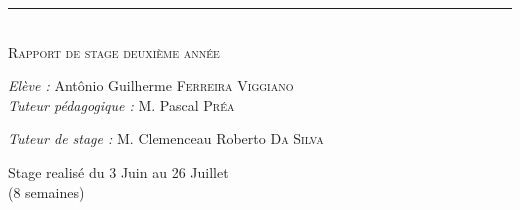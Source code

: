 \begin{titlepage}
\begin{center}
\hrule  ~\\[0.5cm]

\textsc{\LARGE Rapport de stage deuxième année}\\[1.5cm]


\end{center}


\vfill


\large\emph{Elève :} \hfill Antônio Guilherme \textsc{Ferreira Viggiano} ~\\

\large\emph{Tuteur pédagogique :} \hfill M. Pascal \textsc{Préa}

\large\emph{Tuteur de stage :} \hfill M. Clemenceau Roberto \textsc{Da Silva}

\vfill

\begin{center}
  \large Stage realisé du 3 Juin au 26 Juillet \\
  (8 semaines)
\end{center}






\end{titlepage}
